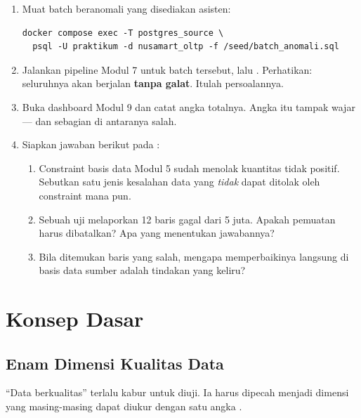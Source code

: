 \begin{enumerate}[leftmargin=1.4em]
  \item Muat batch beranomali yang disediakan asisten:
\begin{lstlisting}[style=shellgaya]
docker compose exec -T postgres_source \
  psql -U praktikum -d nusamart_oltp -f /seed/batch_anomali.sql
\end{lstlisting}
  \item Jalankan pipeline Modul 7 untuk batch tersebut, lalu .
        Perhatikan: seluruhnya akan berjalan \textbf{tanpa galat}. Itulah
        persoalannya.
  \item Buka dashboard Modul 9 dan catat angka totalnya. Angka itu tampak
        wajar --- dan sebagian di antaranya salah.
  \item Siapkan jawaban berikut pada :
  \begin{enumerate}[label=\alph*.,leftmargin=1.4em]
    \item Constraint basis data Modul 5 sudah menolak kuantitas tidak positif.
          Sebutkan satu jenis kesalahan data yang \emph{tidak} dapat ditolak
          oleh constraint mana pun.
    \item Sebuah uji melaporkan 12 baris gagal dari 5 juta. Apakah pemuatan
          harus dibatalkan? Apa yang menentukan jawabannya?
    \item Bila ditemukan baris yang salah, mengapa memperbaikinya langsung di
          basis data sumber adalah tindakan yang keliru?
  \end{enumerate}
\end{enumerate}

\section{Konsep Dasar}

\subsection{Enam Dimensi Kualitas Data}

``Data berkualitas'' terlalu kabur untuk diuji. Ia harus dipecah menjadi
dimensi yang masing-masing dapat diukur dengan satu angka
\citep{batini2016, dama2017}.

